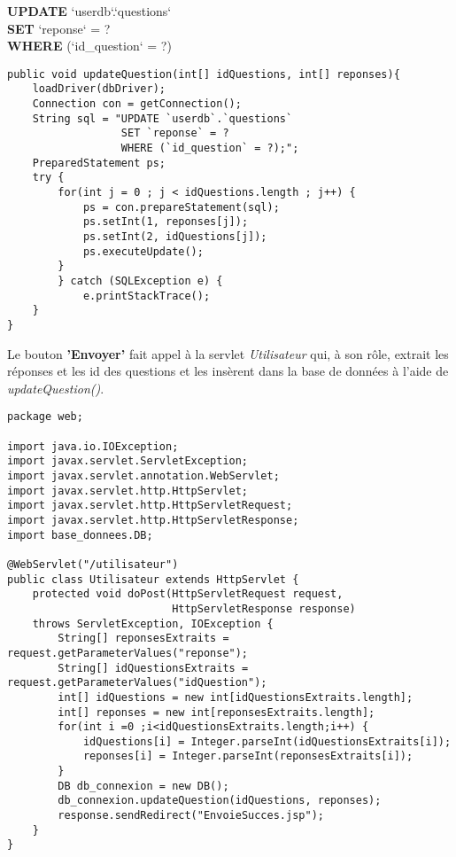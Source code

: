 \documentclass[12]{article}
\begin{document}
\textbf{UPDATE} `userdb`.`questions` \\
\textbf{SET} `reponse` = ? \\
\textbf{WHERE} (`id\_question` = ?)\\

\lstset{language=java}
\begin{lstlisting}
public void updateQuestion(int[] idQuestions, int[] reponses){
	loadDriver(dbDriver);
	Connection con = getConnection();
	String sql = "UPDATE `userdb`.`questions` 
				  SET `reponse` = ? 
				  WHERE (`id_question` = ?);";
	PreparedStatement ps;
	try {
		for(int j = 0 ; j < idQuestions.length ; j++) {
			ps = con.prepareStatement(sql);
			ps.setInt(1, reponses[j]);
			ps.setInt(2, idQuestions[j]);
			ps.executeUpdate();
		}
		} catch (SQLException e) {
			e.printStackTrace();
	}
}
\end{lstlisting}



Le bouton \textbf{'Envoyer'} fait appel à la servlet \textit{Utilisateur} qui, à son rôle, extrait les réponses et les id des questions et les insèrent dans la base de données à l'aide de \textit{updateQuestion()}.



\begin{small}

\begin{lstlisting}
package web;

import java.io.IOException;
import javax.servlet.ServletException;
import javax.servlet.annotation.WebServlet;
import javax.servlet.http.HttpServlet;
import javax.servlet.http.HttpServletRequest;
import javax.servlet.http.HttpServletResponse;
import base_donnees.DB;

@WebServlet("/utilisateur")
public class Utilisateur extends HttpServlet {
	protected void doPost(HttpServletRequest request, 
						  HttpServletResponse response) 
	throws ServletException, IOException {
		String[] reponsesExtraits = request.getParameterValues("reponse");
		String[] idQuestionsExtraits = request.getParameterValues("idQuestion");
		int[] idQuestions = new int[idQuestionsExtraits.length];
		int[] reponses = new int[reponsesExtraits.length];
		for(int i =0 ;i<idQuestionsExtraits.length;i++) {
			idQuestions[i] = Integer.parseInt(idQuestionsExtraits[i]);
			reponses[i] = Integer.parseInt(reponsesExtraits[i]);
		}
		DB db_connexion = new DB();
		db_connexion.updateQuestion(idQuestions, reponses);		
		response.sendRedirect("EnvoieSucces.jsp");
	}
}
\end{lstlisting}
\end{small}
\end{document}
